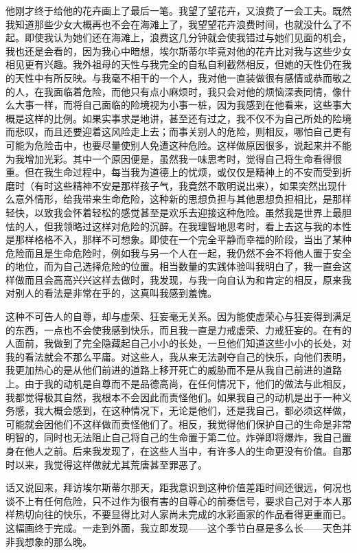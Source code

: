 \par 他刚才终于给他的花卉画上了最后一笔。我望了望花卉，又浪费了一会工夫。既然我知道那些少女大概再也不会在海滩上了，我望望花卉浪费时间，也就没什么了不起。即使我认为她们还在海滩上，浪费这几分钟就会使我错过与她们见面的机会，我也还是会看的，因为我心中暗想，埃尔斯蒂尔毕竟对他的花卉比对我与这些少女相见更有兴趣。我外祖母的天性与我完全的自私自利截然相反，但她的天性仍在我的天性中有所反映。与我毫不相干的一个人，我对他一直装做很有感情或恭而敬之的人，在我面临着危险，而他只有点小麻烦时，我只会对他的烦恼深表同情，像什么大事一样，而将自己面临的险境视为小事一桩，因为我感到在他看来，这些事大概是这样的比例。如果实事求是地讲，甚至还有过之，我不仅不为自己所处的险境而悲叹，而且还要迎着这风险走上去；而事关别人的危险，则相反，哪怕自己更有可能为危险击中，也要尽量使别人免遭这种危险。这样做原因很多，说起来并不能为我增加光彩。其中一个原因便是，虽然我一味思考时，觉得自己将生命看得很重。但在我生命过程中，每当我为道德上的忧烦，或仅仅是精神上的不安而受到折磨时（有时这些精神不安是那样孩子气，我竟然不敢明说出来），如果突然出现什么意外情形，给我带来生命危险，这种新的思想负担与其他思想负担相比，是那样轻快，以致我会怀着轻松的感觉甚至是欢乐去迎接这种危险。虽然我是世界上最胆怯的人，但我领略过这样对危险的沉醉。在我理智地思考时，看上去这与我的本性是那样格格不入，那样不可想象。即使在一个完全平静而幸福的阶段，当出了某种危险而且是生命危险时，例如我与另一个人在一起，我仍然不会不将他人置于安全的地位，而为自己选择危险的位置。相当数量的实践体验叫我明白了，我一直会这样做而且会高高兴兴这样去做时，我发现，与我一向自认为和肯定的相反，原来我对别人的看法是非常在乎的，这真叫我感到羞愧。
\par 这种不可告人的自尊，却与虚荣、狂妄毫无关系。因为能使虚荣心与狂妄得到满足的东西，一点也不会使我感到快乐，而且我一直是力戒虚荣、力戒狂妄的。在有的人面前，我做到了完全隐藏起自己小小的长处，一旦他们知道这些小小的长处，对我的看法就会不那么平庸。对这些人，我从来无法剥夺自己的快乐，向他们表明，我更加热心的是从他们前进的道路上移开死亡的威胁而不是从我自己前进的道路上。由于我的动机是自尊而不是品德高尚，在任何情况下，他们的做法与此相反，我都觉得极其自然，我根本不会因此而责怪他们。如果我自己的动机是出于一种义务感，我大概会感到，在这种情况下，无论是他们，还是我自己，都必须这样做，可能就会因他们不这样做而责怪他们了。相反，我觉得他们保护自己的生命是非常明智的，同时也无法阻止自己将自己的生命置于第二位。炸弹即将爆炸，我自己置身在他人之前。后来我发现了，在这些人当中，有许多人的生命更没有价值。自那时以来，我觉得这样做就尤其荒唐甚至罪恶了。
\par 话又说回来，拜访埃尔斯蒂尔那天，距我意识到这种价值差距时间还很远，何况也谈不上有任何危险，只不过作为很有害的自尊心的前奏信号，要求自己对于本人那样热切向往的快乐，不要显得比对人家尚未完成的水彩画家的作品看得更重而已。这幅画终于完成。一走到外面，我立即发现——这个季节白昼是多么长——天色并非我想象的那么晚。
